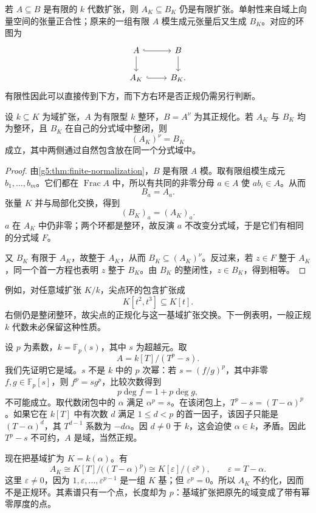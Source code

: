 \ProseParagraphBreak

若 \(A\subseteq B\) 是有限的 \(k\) 代数扩张，则 \(A_K\subseteq B_K\) 仍是有限扩张。单射性来自域上向量空间的张量正合性；原来的一组有限 \(A\) 模生成元张量后又生成 \(B_K\)。对应的环图为
\[
	\begin{tikzcd}
		A \arrow[r,hook] \arrow[d] & B \arrow[d] \\
		A_K \arrow[r,hook] & B_K.
	\end{tikzcd}
\]
有限性因此可以直接传到下方，而下方右环是否正规仍需另行判断。

\begin{proposition}
\label{g5:prop:normalization-field-extension}
	设 \(k\subseteq K\) 为域扩张，\(A\) 为有限型 \(k\) 整环，\(B=A^\nu\) 为其正规化。若 \(A_K\) 与 \(B_K\) 均为整环，且 \(B_K\) 在自己的分式域中整闭，则
	\[
		(A_K)^\nu=B_K
	\]
	成立，其中两侧通过自然包含放在同一个分式域中。
\end{proposition}
\begin{proof}
	由\cref{g5:thm:finite-normalization}，\(B\) 是有限 \(A\) 模。取有限组模生成元 \(b_1,\ldots,b_m\)。它们都在 \(\operatorname{Frac}A\) 中，所以有共同的非零分母 \(a\in A\) 使 \(ab_i\in A\)。从而
	\[
		B_a=A_a.
	\]
	张量 \(K\) 并与局部化交换，得到
	\[
		(B_K)_a=(A_K)_a.
	\]
	\(a\) 在 \(A_K\) 中仍非零；两个环都是整环，故反演 \(a\) 不改变分式域，于是它们有相同的分式域 \(F\)。

	又 \(B_K\) 有限于 \(A_K\)，故整于 \(A_K\)，从而 \(B_K\subseteq(A_K)^\nu\)。反过来，若 \(z\in F\) 整于 \(A_K\)，同一个首一方程也表明 \(z\) 整于 \(B_K\)。由 \(B_K\) 的整闭性，\(z\in B_K\)，得到相等。
\end{proof}

例如，对任意域扩张 \(K/k\)，尖点环的包含扩张成
\[
	K[t^2,t^3]\subseteq K[t].
\]
右侧仍是整闭整环，故尖点的正规化与这一基域扩张交换。下一例表明，一般正规 \(k\) 代数未必保留这种性质。

\begin{example}
\label{g5:exm:inseparable-normality-loss}
	设 \(p\) 为素数，\(k=\mathbb F_p(s)\)，其中 \(s\) 为超越元。取
	\[
		A=k[T]/(T^p-s).
	\]
	我们先证明它是域。\(s\) 不是 \(k\) 中的 \(p\) 次幂：若 \(s=(f/g)^p\)，其中非零 \(f,g\in\mathbb F_p[s]\)，则 \(f^p=sg^p\)，比较次数得到
	\[
		p\deg f=1+p\deg g,
	\]
	不可能成立。取代数闭包中的 \(\alpha\) 满足 \(\alpha^p=s\)。在该闭包上，\(T^p-s=(T-\alpha)^p\)。如果它在 \(k[T]\) 中有次数 \(d\) 满足 \(1\leq d<p\) 的首一因子，该因子只能是 \((T-\alpha)^d\)，其 \(T^{d-1}\) 系数为 \(-d\alpha\)。因 \(d\ne0\) 于 \(k\)，这会迫使 \(\alpha\in k\)，矛盾。因此 \(T^p-s\) 不可约，\(A\) 是域，当然正规。

	现在把基域扩为 \(K=k(\alpha)\)。有
	\[
		A_K
		\cong K[T]/\bigl((T-\alpha)^p\bigr)
		\cong K[\varepsilon]/(\varepsilon^p),
		\qquad \varepsilon=T-\alpha.
	\]
	这里 \(\varepsilon\ne0\)，因为 \(1,\varepsilon,\ldots,\varepsilon^{p-1}\) 是一组 \(K\) 基；但 \(\varepsilon^p=0\)。所以 \(A_K\) 不约化，因而不是正规环。其素谱只有一个点，长度却为 \(p\)：基域扩张把原先的域变成了带有幂零厚度的点。
\end{example}

